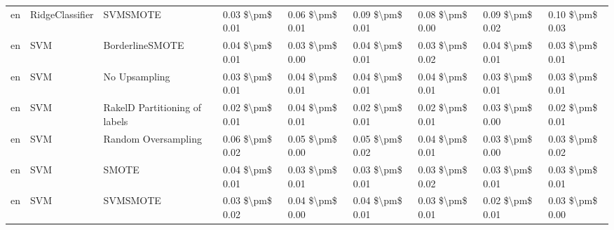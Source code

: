 \begin{tabular}{lllllllll}
      en &                 RidgeClassifier &                      SVMSMOTE & 0.03 \$\textbackslash pm\$ 0.01 &           0.06 \$\textbackslash pm\$ 0.01 &       0.09 \$\textbackslash pm\$ 0.01 &        0.08 \$\textbackslash pm\$ 0.00 &                         0.09 \$\textbackslash pm\$ 0.02 &     0.10 \$\textbackslash pm\$ 0.03 \\
      en &                             SVM &               BorderlineSMOTE & 0.04 \$\textbackslash pm\$ 0.01 &           0.03 \$\textbackslash pm\$ 0.00 &       0.04 \$\textbackslash pm\$ 0.01 &        0.03 \$\textbackslash pm\$ 0.02 &                         0.04 \$\textbackslash pm\$ 0.01 &     0.03 \$\textbackslash pm\$ 0.01 \\
      en &                             SVM &                 No Upsampling & 0.03 \$\textbackslash pm\$ 0.01 &           0.04 \$\textbackslash pm\$ 0.01 &       0.04 \$\textbackslash pm\$ 0.01 &        0.04 \$\textbackslash pm\$ 0.01 &                         0.03 \$\textbackslash pm\$ 0.01 &     0.03 \$\textbackslash pm\$ 0.01 \\
      en &                             SVM & RakelD Partitioning of labels & 0.02 \$\textbackslash pm\$ 0.01 &           0.04 \$\textbackslash pm\$ 0.01 &       0.02 \$\textbackslash pm\$ 0.01 &        0.02 \$\textbackslash pm\$ 0.01 &                         0.03 \$\textbackslash pm\$ 0.00 &     0.02 \$\textbackslash pm\$ 0.01 \\
      en &                             SVM &           Random Oversampling & 0.06 \$\textbackslash pm\$ 0.02 &           0.05 \$\textbackslash pm\$ 0.00 &       0.05 \$\textbackslash pm\$ 0.02 &        0.04 \$\textbackslash pm\$ 0.01 &                         0.03 \$\textbackslash pm\$ 0.00 &     0.03 \$\textbackslash pm\$ 0.02 \\
      en &                             SVM &                         SMOTE & 0.04 \$\textbackslash pm\$ 0.01 &           0.03 \$\textbackslash pm\$ 0.01 &       0.03 \$\textbackslash pm\$ 0.01 &        0.03 \$\textbackslash pm\$ 0.02 &                         0.03 \$\textbackslash pm\$ 0.01 &     0.03 \$\textbackslash pm\$ 0.01 \\
      en &                             SVM &                      SVMSMOTE & 0.03 \$\textbackslash pm\$ 0.02 &           0.04 \$\textbackslash pm\$ 0.00 &       0.04 \$\textbackslash pm\$ 0.01 &        0.03 \$\textbackslash pm\$ 0.01 &                         0.02 \$\textbackslash pm\$ 0.01 &     0.03 \$\textbackslash pm\$ 0.00 \\

\end{tabular}
